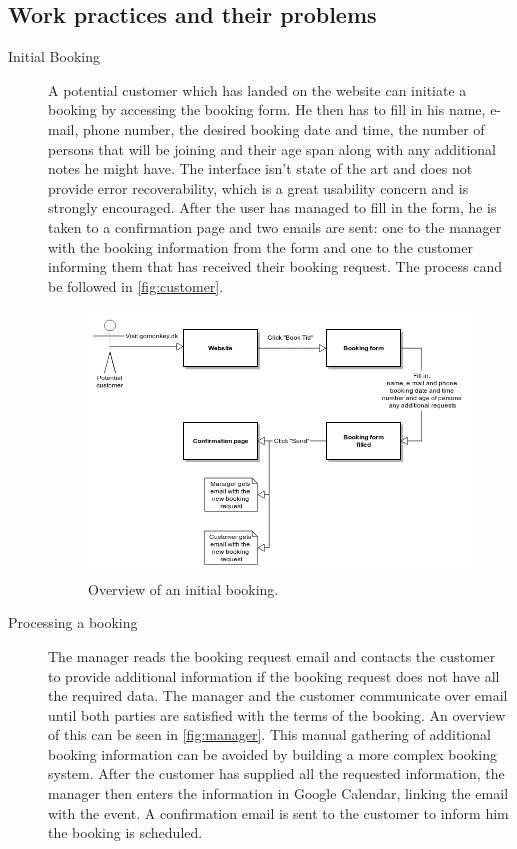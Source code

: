 \subsection{Work practices and their problems}
\begin{description}
\item[Initial Booking]
A potential customer which has landed on the website can initiate a booking
by accessing the booking form. He then has to fill in his name, e-mail, phone number, 
the desired booking date and time, the number of persons that will be joining and their
age span along with any additional notes he might have. The interface isn't state of the art 
and does not provide error recoverability, which is a great usability concern and is 
strongly encouraged. After the user has managed to fill in the form, he is taken to a confirmation
page and two emails are sent: one to the manager with the booking information from the form and
one to the customer informing them that \gomonkey{} has received their booking request. The process
cand be followed in \autoref{fig:customer}.

\begin{figure}[htbp]
    \centering
        \includegraphics[width=\textwidth]{figures/customer.png}
            \caption{Overview of an initial booking.}
        \label{fig:customer}
\end{figure}

\item[Processing a booking]
The manager reads the booking request email and contacts the customer to provide additional
information if the booking request does not have all the required data. The manager and the 
customer communicate over email until both parties are satisfied with the terms of the booking.
An overview of this can be seen in \autoref{fig:manager}. This manual gathering of additional
booking information can be avoided by building a more complex booking system. After the customer
has supplied all the requested information, the manager then enters the information in Google
Calendar, linking the email with the event. A confirmation email is sent to the customer to
inform him the booking is scheduled.


\end{description}
